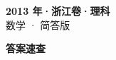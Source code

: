 \documentclass[zihao=-4, a4paper]{ctexart}
\begin{document}
\begin{center}
  {\Large\bfseries 2013 年·浙江卷·理科}\\[4pt]
  {\large 数学 · 简答版}
\end{center}
\medskip
{}

\clearpage
{}
\begin{center}{\Large\bfseries 答案速查}\end{center}
\medskip

\end{document}
